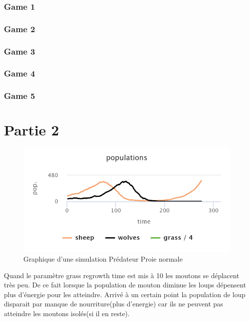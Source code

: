 \documentclass{article}
\begin{document}
\subsubsection{Game 1}
\subsubsection{Game 2}
\subsubsection{Game 3}
\subsubsection{Game 4}
\subsubsection{Game 5}


\clearpage

\newpage
\section{Partie 2}
\begin{figure}[htbp]
	\includegraphics[width=1.0\textwidth]{chart.png}
		\caption{Graphique d'une simulation Prédateur Proie normale}
	\label{fig:chart}
\end{figure}

Quand le paramètre grass regrowth time est mis à 10 les moutons se déplacent très peu. De ce fait lorsque la population de mouton diminue les loups dépensent plus d’énergie pour les atteindre. Arrivé à un certain point la population de loup disparait par manque de nourriture(plus d’energie) car ils ne peuvent pas atteindre les moutons isolés(si il en reste).
\end{document}
